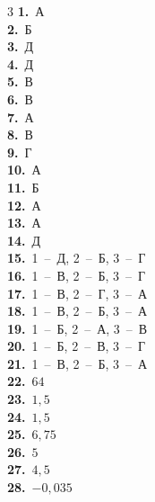 \documentclass[12pt]{article}
\begin{document}
\begin{multicols}{3}\noindent
\textbf{1.}~А\\
\textbf{2.}~Б\\
\textbf{3.}~Д\\
\textbf{4.}~Д\\
\textbf{5.}~В\\
\textbf{6.}~В\\
\textbf{7.}~А\\
\textbf{8.}~В\\
\textbf{9.}~Г\\
\textbf{10.}~А\\
\textbf{11.}~Б\\
\textbf{12.}~А\\
\textbf{13.}~А\\
\textbf{14.}~Д\\
\textbf{15.}~1~--~Д, 2~--~Б, 3~--~Г\\
\textbf{16.}~1~--~В, 2~--~Б, 3~--~Г\\
\textbf{17.}~1~--~В, 2~--~Г, 3~--~А\\
\textbf{18.}~1~--~В, 2~--~Б, 3~--~А\\
\textbf{19.}~1~--~Б, 2~--~А, 3~--~В\\
\textbf{20.}~1~--~Б, 2~--~В, 3~--~Г\\
\textbf{21.}~1~--~В, 2~--~Б, 3~--~А\\
\textbf{22.}~$64$\\
\textbf{23.}~$1{,}5$\\
\textbf{24.}~$1{,}5$\\
\textbf{25.}~$6{,}75$\\
\textbf{26.}~$5$\\
\textbf{27.}~$4{,}5$\\
\textbf{28.}~$-0{,}035$\\
\end{multicols}
\end{document}
